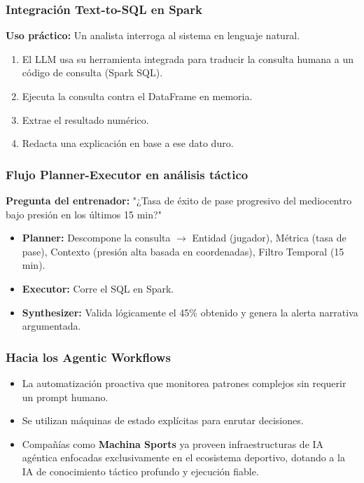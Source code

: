 \documentclass[aspectratio=169]{beamer}
\begin{document}
\begin{frame}\frametitle{Integración Text-to-SQL en Spark}
\textbf{Uso práctico:} Un analista interroga al sistema en lenguaje natural.
\begin{enumerate}
    \item El LLM usa su herramienta integrada para traducir la consulta humana a un código de consulta (Spark SQL).
    \item Ejecuta la consulta contra el DataFrame en memoria.
    \item Extrae el resultado numérico.
    \item Redacta una explicación en base a ese dato duro.
\end{enumerate}
\end{frame}

\begin{frame}\frametitle{Flujo Planner-Executor en análisis táctico}
\textbf{Pregunta del entrenador:} "¿Tasa de éxito de pase progresivo del mediocentro bajo presión en los últimos 15 min?"
\begin{itemize}
    \item \textbf{Planner:} Descompone la consulta $\rightarrow$ Entidad (jugador), Métrica (tasa de pase), Contexto (presión alta basada en coordenadas), Filtro Temporal (15 min).
    \item \textbf{Executor:} Corre el SQL en Spark.
    \item \textbf{Synthesizer:} Valida lógicamente el 45\% obtenido y genera la alerta narrativa argumentada.
\end{itemize}
\end{frame}

\begin{frame}\frametitle{Hacia los Agentic Workflows}
\begin{itemize}
    \item La automatización proactiva que monitorea patrones complejos sin requerir un prompt humano.
    \item Se utilizan máquinas de estado explícitas para enrutar decisiones.
    \item Compañías como \textbf{Machina Sports} ya proveen infraestructuras de IA agéntica enfocadas exclusivamente en el ecosistema deportivo, dotando a la IA de conocimiento táctico profundo y ejecución fiable.
\end{itemize}
\end{frame}
\end{document}
